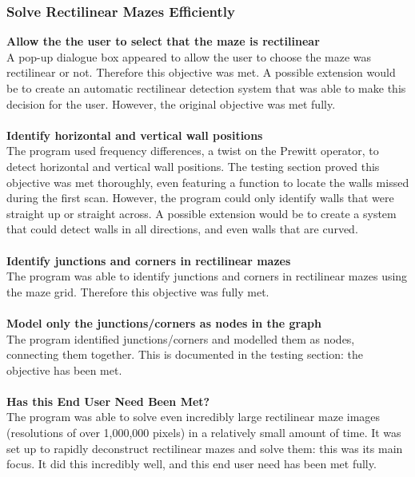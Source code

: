 \documentclass[titlepage]{article}
\begin{document}
\subsubsection{Solve Rectilinear Mazes Efficiently}
\textbf{Allow the the user to select that the maze is rectilinear}\\
A pop-up dialogue box appeared to allow the user to choose the maze was rectilinear or not. Therefore this objective was met. A possible extension would be to create an automatic rectilinear detection system that was able to make this decision for the user. However, the original objective was met fully. \\\\
\textbf{Identify horizontal and vertical wall positions}\\
The program used frequency differences, a twist on the Prewitt operator, to detect horizontal and vertical wall positions. The testing section proved this objective was met thoroughly, even featuring a function to locate the walls missed during the first scan. However, the program could only identify walls that were straight up or straight across. A possible extension would be to create a system that could detect walls in all directions, and even walls that are curved. \\\\
\textbf{Identify junctions and corners in rectilinear mazes}\\
The program was able to identify junctions and corners in rectilinear mazes using the maze grid. Therefore this objective was fully met.\\\\
\textbf{Model only the junctions/corners as nodes in the graph}\\
The program identified junctions/corners and modelled them as nodes, connecting them together. This is documented in the testing section: the objective has been met.\\\\
\textbf{Has this End User Need Been Met?}\\
The program was able to solve even incredibly large rectilinear maze images (resolutions of over 1,000,000 pixels) in a relatively small amount of time. It was set up to rapidly deconstruct rectilinear mazes and solve them: this was its main focus. It did this incredibly well, and this end user need has been met fully.
\end{document}

